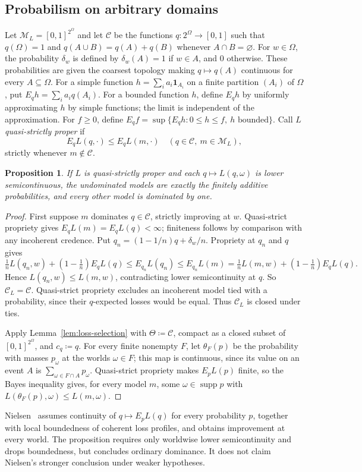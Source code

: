 \documentclass[11pt]{article}
\newtheorem{proposition}[theorem]{Proposition}
\theoremstyle{definition}
\theoremstyle{remark}
\newcommand{\M}{\mathcal M}
\newcommand{\C}{\mathcal C}
\newcommand{\supp}{\operatorname{supp}}
\begin{document}
\subsection{Probabilism on arbitrary domains}
Let $\M_L=[0,1]^{2^\Omega}$ and let $\C$ be the functions $q:2^\Omega\to[0,1]$ such that $q(\Omega)=1$ and $q(A\cup B)=q(A)+q(B)$ whenever $A\cap B=\varnothing$. For $w\in\Omega$, the probability $\delta_w$ is defined by $\delta_w(A)=1$ if $w\in A$, and $0$ otherwise. These probabilities are given the coarsest topology making $q\mapsto q(A)$ continuous for every $A\subseteq\Omega$. For a simple function $h=\sum_i a_i\mathbf1_{A_i}$ on a finite partition $(A_i)$ of $\Omega$, put $E_qh=\sum_i a_iq(A_i)$. For a bounded function $h$, define $E_qh$ by uniformly approximating $h$ by simple functions; the limit is independent of the approximation. For $f\ge0$, define $E_qf=\sup\{E_qh:0\le h\le f,\ h\text{ bounded}\}$. Call $L$ \emph{quasi-strictly proper} if
\[
E_qL(q,\cdot)\le E_qL(m,\cdot)\quad(q\in\C,\ m\in\M_L),
\]
strictly whenever $m\notin\C$.
\begin{proposition}\label{prop:short-infinite}
If $L$ is quasi-strictly proper and each $q\mapsto L(q,\omega)$ is lower semicontinuous, the undominated models are exactly the finitely additive probabilities, and every other model is dominated by one.
\end{proposition}
\begin{proof}
First suppose $m$ dominates $q\in\C$, strictly improving at $w$. Quasi-strict propriety gives $E_qL(m)=E_qL(q)<\infty$; finiteness follows by comparison with any incoherent credence. Put $q_n=(1-1/n)q+\delta_w/n$. Propriety at $q_n$ and $q$ gives
\[
\tfrac1nL(q_n,w)+(1-\tfrac1n)E_qL(q)
\le E_{q_n}L(q_n)\le E_{q_n}L(m)
=\tfrac1nL(m,w)+(1-\tfrac1n)E_qL(q).
\]
Hence $L(q_n,w)\le L(m,w)$, contradicting lower semicontinuity at $q$. So $\C_L=\C$. Quasi-strict propriety excludes an incoherent model tied with a probability, since their $q$-expected losses would be equal. Thus $\C_L$ is closed under ties.

Apply Lemma~\ref{lem:loss-selection} with $\Theta\coloneqq\C$, compact as a closed subset of $[0,1]^{2^\Omega}$, and $c_q\coloneqq q$. For every finite nonempty $F$, let $\theta_F(p)$ be the probability with masses $p_\omega$ at the worlds $\omega\in F$; this map is continuous, since its value on an event $A$ is $\sum_{\omega\in F\cap A}p_\omega$. Quasi-strict propriety makes $E_pL(p)$ finite, so the Bayes inequality gives, for every model $m$, some $\omega\in\supp p$ with $L(\theta_F(p),\omega)\le L(m,\omega)$.
\end{proof}
Nielsen~\cite{Nielsen2023} assumes continuity of $q\mapsto E_pL(q)$ for every probability $p$, together with local boundedness of coherent loss profiles, and obtains improvement at every world. The proposition requires only worldwise lower semicontinuity and drops boundedness, but concludes ordinary dominance. It does not claim Nielsen's stronger conclusion under weaker hypotheses.
\end{document}
